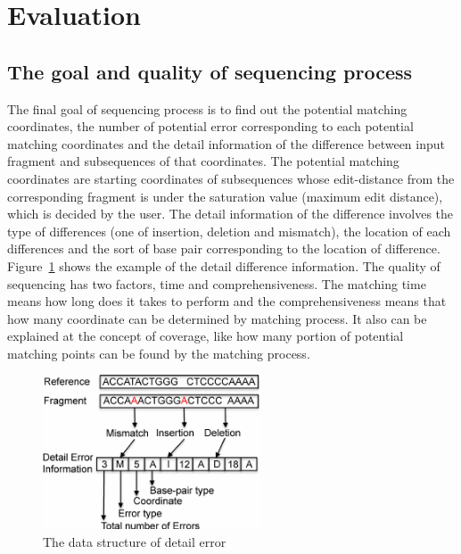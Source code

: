 \section{Evaluation} \label{sec:evaluation} 

\subsection{The goal and quality of sequencing process} 

The final goal of sequencing process is to find out the potential matching
coordinates, the number of potential error corresponding to each potential
matching coordinates and the detail information of the difference between input
fragment and subsequences of that coordinates. The potential matching
coordinates are starting coordinates of subsequences whose edit-distance from
the corresponding fragment is under the saturation value (maximum edit
distance), which is decided by the user. The detail information of the
difference involves the type of differences (one of insertion, deletion and
mismatch), the location of each differences and the sort of base pair
corresponding to the location of difference. Figure~\ref{fig:detail_error}
shows the example of the detail difference information. The quality of
sequencing has two factors, time and comprehensiveness. The matching time means
how long does it takes to perform and the comprehensiveness means that how many
coordinate can be determined by matching process. It also can be explained at
the concept of coverage, like how many portion of potential matching points can
be found by the matching process.\\

\begin{figure}[t] \centering
\vspace{0.1in}
\includegraphics[height=1.8in]{./figure/Detail_Error_B.pdf} \vspace{0in}
\caption{The data structure of detail error}
\label{fig:detail_error} \end{figure}

